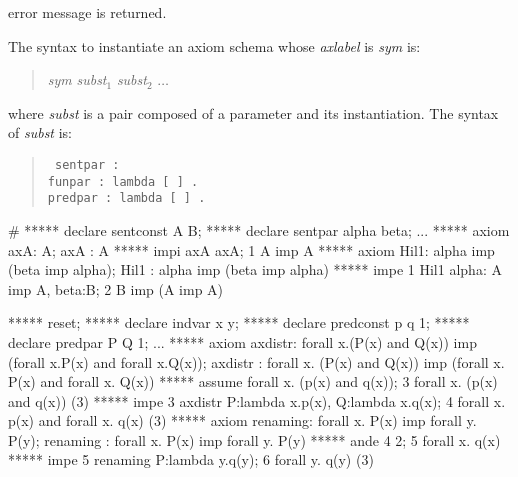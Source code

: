 {\begin{enumerate}
      error message is returned.
  \end{enumerate}
  The syntax to instantiate an axiom schema whose {\em axlabel} is {\em sym} is:
  \begin{quote}
    {\em sym} {\em subst$_1$} {\em subst$_2$} $\ldots$
  \end{quote}
  where {\em subst} is a  pair composed of a parameter and its instantiation. The
  syntax of {\em subst} is:
  \begin{quote}\tt
     sentpar :  \\
     funpar  : lambda  
                        [  \SEQ] .
                        \\
     predpar : lambda  
                        [  \SEQ ] .
                        \\
  \end{quote}
}


\gfexample#
   ***** declare sentconst A B;
   ***** declare sentpar alpha beta;
   ...
   ***** axiom axA: A;
   axA : A
   ***** impi axA axA; 
   1   A imp A     
   ***** axiom Hil1: alpha imp (beta imp alpha);
   Hil1 : alpha imp (beta imp alpha)
   ***** impe 1 Hil1 alpha: A imp A, beta:B;
   2   B imp (A imp A)     

   ***** reset;   
   ***** declare indvar x y;
   ***** declare predconst p q 1;
   ***** declare predpar P Q 1;
   ...
   ***** axiom axdistr: forall x.(P(x) and Q(x)) imp
                        (forall x.P(x) and forall x.Q(x));
   axdistr : forall x. (P(x) and Q(x)) imp (forall x. P(x) and forall x. Q(x))
   ***** assume forall x. (p(x) and q(x));
   3   forall x. (p(x) and q(x))     (3)
   ***** impe 3 axdistr P:lambda x.p(x), Q:lambda x.q(x);
   4   forall x. p(x) and forall x. q(x)     (3)
   ***** axiom renaming: forall x. P(x) imp forall y. P(y);
   renaming : forall x. P(x) imp forall y. P(y)
   ***** ande 4 2;
   5   forall x. q(x)     
   ***** impe 5  renaming P:lambda y.q(y);
   6   forall y. q(y)     (3)
   
